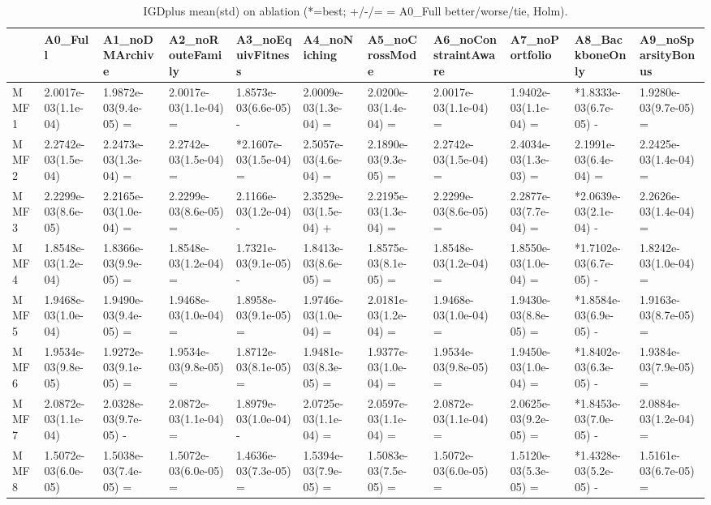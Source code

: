 \begin{table}[t]
\centering
\caption{IGDplus mean(std) on ablation (*=best; +/-/= = A0_Full better/worse/tie, Holm).}
\label{tab:ablation_IGDplus}
\begin{tabular}{lllllllllll}
\toprule
 & A0\_Full & A1\_noDMArchive & A2\_noRouteFamily & A3\_noEquivFitness & A4\_noNiching & A5\_noCrossMode & A6\_noConstraintAware & A7\_noPortfolio & A8\_BackboneOnly & A9\_noSparsityBonus \\
\midrule
MMF1 & 2.0017e-03(1.1e-04) & 1.9872e-03(9.4e-05) = & 2.0017e-03(1.1e-04) = & 1.8573e-03(6.6e-05) - & 2.0009e-03(1.3e-04) = & 2.0200e-03(1.4e-04) = & 2.0017e-03(1.1e-04) = & 1.9402e-03(1.1e-04) = & *1.8333e-03(6.7e-05) - & 1.9280e-03(9.7e-05) = \\
MMF2 & 2.2742e-03(1.5e-04) & 2.2473e-03(1.3e-04) = & 2.2742e-03(1.5e-04) = & *2.1607e-03(1.5e-04) = & 2.5057e-03(4.6e-04) = & 2.1890e-03(9.3e-05) = & 2.2742e-03(1.5e-04) = & 2.4034e-03(1.3e-03) = & 2.1991e-03(6.4e-04) = & 2.2425e-03(1.4e-04) = \\
MMF3 & 2.2299e-03(8.6e-05) & 2.2165e-03(1.0e-04) = & 2.2299e-03(8.6e-05) = & 2.1166e-03(1.2e-04) - & 2.3529e-03(1.5e-04) + & 2.2195e-03(1.3e-04) = & 2.2299e-03(8.6e-05) = & 2.2877e-03(7.7e-04) = & *2.0639e-03(2.1e-04) - & 2.2626e-03(1.4e-04) = \\
MMF4 & 1.8548e-03(1.2e-04) & 1.8366e-03(9.9e-05) = & 1.8548e-03(1.2e-04) = & 1.7321e-03(9.1e-05) - & 1.8413e-03(8.6e-05) = & 1.8575e-03(8.1e-05) = & 1.8548e-03(1.2e-04) = & 1.8550e-03(1.0e-04) = & *1.7102e-03(6.7e-05) - & 1.8242e-03(1.0e-04) = \\
MMF5 & 1.9468e-03(1.0e-04) & 1.9490e-03(9.4e-05) = & 1.9468e-03(1.0e-04) = & 1.8958e-03(9.1e-05) = & 1.9746e-03(1.0e-04) = & 2.0181e-03(1.2e-04) = & 1.9468e-03(1.0e-04) = & 1.9430e-03(8.8e-05) = & *1.8584e-03(6.9e-05) - & 1.9163e-03(8.7e-05) = \\
MMF6 & 1.9534e-03(9.8e-05) & 1.9272e-03(9.1e-05) = & 1.9534e-03(9.8e-05) = & 1.8712e-03(8.1e-05) = & 1.9481e-03(8.3e-05) = & 1.9377e-03(1.0e-04) = & 1.9534e-03(9.8e-05) = & 1.9450e-03(1.0e-04) = & *1.8402e-03(6.3e-05) - & 1.9384e-03(7.9e-05) = \\
MMF7 & 2.0872e-03(1.1e-04) & 2.0328e-03(9.7e-05) - & 2.0872e-03(1.1e-04) = & 1.8979e-03(1.0e-04) - & 2.0725e-03(1.1e-04) = & 2.0597e-03(1.1e-04) = & 2.0872e-03(1.1e-04) = & 2.0625e-03(9.2e-05) = & *1.8453e-03(7.0e-05) - & 2.0884e-03(1.2e-04) = \\
MMF8 & 1.5072e-03(6.0e-05) & 1.5038e-03(7.4e-05) = & 1.5072e-03(6.0e-05) = & 1.4636e-03(7.3e-05) = & 1.5394e-03(7.9e-05) = & 1.5083e-03(7.5e-05) = & 1.5072e-03(6.0e-05) = & 1.5120e-03(5.3e-05) = & *1.4328e-03(5.2e-05) - & 1.5161e-03(6.7e-05) = \\
\bottomrule
\end{tabular}
\end{table}
